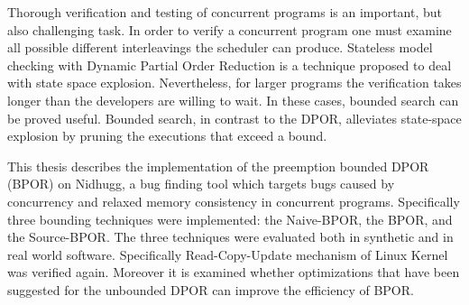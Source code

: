 Thorough verification and testing of concurrent programs is an important, but also
challenging task. In order to verify a concurrent program one must examine all possible 
different interleavings the scheduler can produce. Stateless model checking with Dynamic Partial Order Reduction 
is a technique proposed to deal with state space explosion. Nevertheless, for larger programs the verification 
takes longer than the developers are willing to wait. In these cases, bounded search can be proved useful. Bounded search,
in contrast to the DPOR, alleviates state-space explosion by pruning the executions that exceed a bound. 

This thesis describes the implementation of the preemption bounded DPOR (BPOR) on Nidhugg, a bug finding tool which targets bugs caused by concurrency
and relaxed memory consistency in concurrent programs. Specifically three bounding techniques were implemented: the Naive-BPOR, the BPOR,
and the Source-BPOR. The three techniques were evaluated both in synthetic and in real world software. Specifically Read-Copy-Update mechanism of Linux Kernel
was verified again. Moreover it is examined whether optimizations that have been suggested for the 
unbounded DPOR can improve the efficiency of BPOR.
